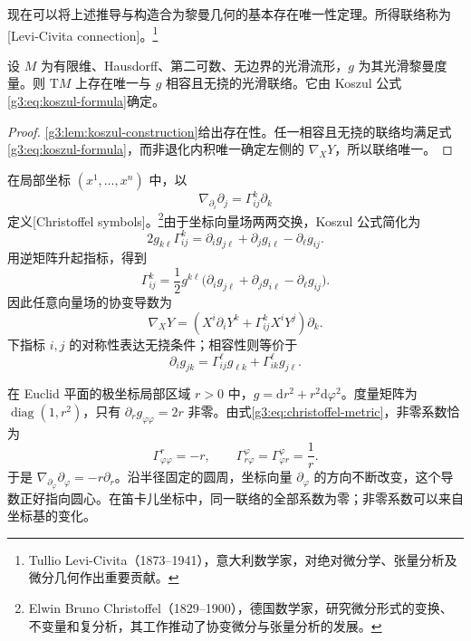 现在可以将上述推导与构造合为黎曼几何的基本存在唯一性定理。所得联络称为[Levi-Civita connection]。\footnote{Tullio Levi-Civita（1873--1941），意大利数学家，对绝对微分学、张量分析及微分几何作出重要贡献。}

\begin{theorem}\label{g3:thm:levi-civita}
	设 \(M\) 为有限维、Hausdorff、第二可数、无边界的光滑流形，\(g\) 为其光滑黎曼度量。则 \(\mathrm{T}M\) 上存在唯一与 \(g\) 相容且无挠的光滑联络。它由 Koszul 公式\eqref{g3:eq:koszul-formula}确定。
\end{theorem}
\begin{proof}
	\cref{g3:lem:koszul-construction}给出存在性。任一相容且无挠的联络均满足式\eqref{g3:eq:koszul-formula}，而非退化内积唯一确定左侧的 \(\nabla_XY\)，所以联络唯一。
\end{proof}

在局部坐标 \((x^1,\ldots,x^n)\) 中，以
\[
	\nabla_{\partial_i}\partial_j=\Gamma^k_{ij}\partial_k
\]
定义[Christoffel symbols]。\footnote{Elwin Bruno Christoffel（1829--1900），德国数学家，研究微分形式的变换、不变量和复分析，其工作推动了协变微分与张量分析的发展。}由于坐标向量场两两交换，Koszul 公式简化为
\[
	2g_{k\ell}\Gamma^k_{ij}=\partial_i g_{j\ell}+\partial_jg_{i\ell}-\partial_\ell g_{ij}.
\]
用逆矩阵升起指标，得到
\begin{equation}\label{g3:eq:christoffel-metric}
	\Gamma^k_{ij}
	=\frac12g^{k\ell}
	\bigl(\partial_i g_{j\ell}+\partial_jg_{i\ell}-\partial_\ell g_{ij}\bigr).
\end{equation}
因此任意向量场的协变导数为
\begin{equation}\label{g3:eq:coordinate-covariant-derivative}
	\nabla_XY
	=\left(X^i\partial_iY^k+\Gamma^k_{ij}X^iY^j\right)\partial_k.
\end{equation}
下指标 \(i,j\) 的对称性表达无挠条件；相容性则等价于
\[
	\partial_i g_{jk}=\Gamma^\ell_{ij}g_{\ell k}+\Gamma^\ell_{ik}g_{j\ell}.
\]

\begin{example}\label{g3:exm:polar-christoffel}
	在 Euclid 平面的极坐标局部区域 \(r>0\) 中，\(g=\mathrm{d}r^2+r^2\mathrm{d}\varphi^2\)。度量矩阵为 \(\operatorname{diag}(1,r^2)\)，只有 \(\partial_rg_{\varphi\varphi}=2r\) 非零。由式\eqref{g3:eq:christoffel-metric}，非零系数恰为
	\[
		\Gamma^r_{\varphi\varphi}=-r,\qquad
		\Gamma^\varphi_{r\varphi}=\Gamma^\varphi_{\varphi r}=\frac1r.
	\]
	于是 \(\nabla_{\partial_\varphi}\partial_\varphi=-r\partial_r\)。沿半径固定的圆周，坐标向量 \(\partial_\varphi\) 的方向不断改变，这个导数正好指向圆心。在笛卡儿坐标中，同一联络的全部系数为零；非零系数可以来自坐标基的变化。
\end{example}

